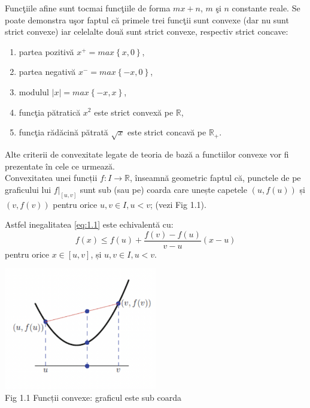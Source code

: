 \documentclass[a4paper,12pt,oneside]{report}
\begin{document}
Func\c{t}iile afine sunt tocmai func\c{t}iile de forma \(mx + n\),  \(m\) \c{s}i \(n\) constante reale.
Se poate demonstra u\c{s}or faptul c\u{a} primele trei func\c{t}ii sunt convexe (dar nu sunt strict convexe) iar celelalte dou\u{a} sunt strict convexe, respectiv strict concave:
\begin{enumerate}
  \item partea pozitiv\u{a} \(x^{+} = max \left \{ x,0 \right \}\),
  \item partea negativ\u{a} \(x^{-} = max \left \{ -x,0 \right \}\),
  \item modulul \(\left | x \right | = max \left \{ -x,x \right \}\),
  \item func\c{t}ia p\u{a}tratic\u{a} \(x^{2}\)  este strict convex\u{a} pe \(\mathbb{R}\),
  \item func\c{t}ia r\u{a}d\u{a}cin\u{a} p\u{a}trat\u{a} \(\sqrt{x}\) este strict concav\u{a} pe \(\mathbb{R}_{+}\).
\end{enumerate}

Alte criterii de convexitate legate de teoria de baz\u{a} a func{t}iilor convexe vor fi prezentate \^{i}n cele ce urmeaz\u{a}.\\

Convexitatea unei funcții \(f : I\rightarrow \mathbb{R}\), înseamnă geometric faptul că, punctele de pe graficului lui  \(f|_{\left [ u,v \right ]}\) sunt sub (sau pe) coarda care unește capetele \(\left ( u , f {\left ( u \right )} \right )\)  și \(\left ( v , f {\left ( v \right )} \right )\) pentru orice \(u, v \in I, u < v\);
(vezi Fig 1.1).

Astfel inegalitatea \ref{eq:1.1} este echivalentă cu:
\begin{displaymath}
  f\left ( x \right )\leq f\left ( u \right ) +\frac{f\left ( v \right )- f\left ( u \right )}{v - u}\left ( x - u \right ) \label{eq:1.2} \tag{1.2}
\end{displaymath}
pentru orice \(x\in \left [  u, v\right ]\), și \(u, v \in I, u < v\).

\begin{center}
	\includegraphics[width=0.5\textwidth]{fig1.1.png}
	\\ Fig 1.1 Funcții convexe: graficul este sub coarda
\end{center}
\end{document}
